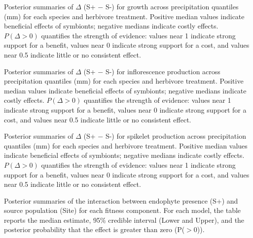 \documentclass[12pt]{article}\usepackage[]{graphicx}\usepackage[dvipsnames]{xcolor}
\begin{document}
{\begin{table}[ht]
    \centering
    \caption{Posterior summaries of $\Delta$ (S+ $-$ S-) for growth across precipitation quantiles (mm) for each species and herbivore treatment.
    Positive median values indicate beneficial effects of symbionts; negative medians indicate costly effects. 
    $P(\Delta>0)$ quantifies the strength of evidence: values near 1 indicate
    strong support for a benefit, values near 0 indicate strong support for a cost, and values near 0.5 indicate little or no consistent effect.}
    \label{tab:delta_summary_grow}
    
\end{table}
\clearpage

\begin{table}[ht]
    \centering
    \caption{Posterior summaries of $\Delta$ (S+ $-$ S-) for inflorescence production across precipitation quantiles (mm) for each species and herbivore treatment.
    Positive median values indicate beneficial effects of symbionts; negative medians indicate costly effects.
    $P(\Delta>0)$ quantifies the strength of evidence: values near 1 indicate strong support for a benefit, values near 0 indicate strong support for a cost, and values near 0.5 indicate little or no consistent effect.}
    \label{tab:delta_summary_flow}
    
\end{table}
\clearpage

\begin{table}[ht]
    \centering
    \caption{Posterior summaries of $\Delta$ (S+ $-$ S-) for spikelet production across precipitation quantiles (mm) for each species and herbivore treatment.
    Positive median values indicate beneficial effects of symbionts; negative medians indicate costly effects.
    $P(\Delta>0)$ quantifies the strength of evidence: values near 1 indicate strong support for a benefit, values near 0 indicate strong support for a cost, and values near 0.5 indicate little or no consistent effect.}
    \label{tab:delta_summary_spike}
    
\end{table}
\clearpage

\begin{table}
    \centering
    \small
        
           \caption{Posterior summaries of the interaction between endophyte presence (S+) and source population (Site) for each fitness component. For each model, the table reports the median estimate, 95\% credible interval (Lower and Upper), and the posterior probability that the effect is greater than zero (P($>0$)).}
    \label{tab:posterior_soil}
\end{table}
\clearpage



}
\end{document}
